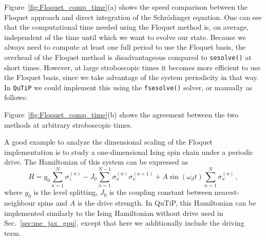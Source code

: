 \documentclass[preprint,3p,sort&compress]{elsarticle}
\def\code#1{\texttt{#1}}
\begin{document}
Figure~\ref{fig:Floquet_comp_time}(a) shows the speed comparison between the Floquet approach and direct integration of the Schrödinger equation. One can see that the computational time needed using the Floquet method is, on average, independent of the time until which we want to evolve our state. Because we always need to compute at least one full period to use the Floquet basis, the overhead of the Floquet method is disadvantageous compared to \code{sesolve()} at short times. However, at large stroboscopic times it becomes more efficient to use the Floquet basis, since we take advantage of the system periodicity in that way.
In \code{QuTiP} we could implement this using the \code{fsesolve()} solver, or manually as follows:

%
Figure~\ref{fig:Floquet_comp_time}(b) shows the agreement between the two methods at arbitrary stroboscopic times.


A good example to analyze the dimensional scaling of the Floquet implementation is to study a one-dimensional Ising spin chain under a periodic drive. The Hamiltonian of this system can be expressed as
\begin{equation}\label{eq:H_Ising_d}
H = g_0 \sum_{n=1}^{N} \sigma_z^{(n)} - J_0 \sum_{n=1}^{N-1} \sigma_x^{(n)} \sigma_x^{(n+1)} + A \sin(\omega_d t) \sum_{n=1}^{N} \sigma_x^{(n)}  \, ,
\end{equation}
where $g_0$ is the level splitting, $J_0$ is the coupling constant between nearest-neighbour spins and $A$ is the drive strength.
In QuTiP, this Hamiltonian can be implemented similarly to the Ising Hamiltonian without drive used in Sec.~\ref{sec:me_jax_gpu}, except that here we additionally include the driving term.
%
%
%
\end{document}
